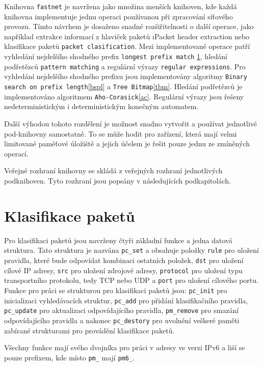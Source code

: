 Knihovna \texttt{fastnet} je navržena jako množina menších knihoven, kde každá knihovna implementuje
jednu operaci používanou při zpracování síťového provozu.
Tímto návrhem je dosaženo snadné rozšiřitelnosti o další operace, jako například extrakce informací z hlaviček paketů
\i{Packet header extraction} nebo klasifikace paketů \texttt{packet clasification}.
Mezi implementované operace patří vyhledání nejdelšího shodného prefix \texttt{longest prefix match} \ref{},
hledání podřetězců \texttt{pattern matching} a regulární výrazy \texttt{regular expressions}.
Pro vyhledání nejdelšího shodného prefixu jsou implementovány algoritmy
\texttt{Binary search on prefix length}\ref{bspl} a \texttt{Tree Bitmap}\ref{tbm}.
Hledání podřetězců je implementováno algoritmem \texttt{Aho-Corasick}\ref{ac}.
Regulární výrazy jsou řešeny nedeterministickým i deterministickým konečným automatem.

Další výhodou tohoto rozdělení je možnost snadno vytvořit a používat jednotlivé pod-knihovny samostatně.
To se může hodit pro zařízení, která mají velmi limitované paměťové úložiště a jejich účelem
je řešit pouze jednu ze zmíněných operací.

Veřejné rozhraní knihovny se skládá z veřejných rozhraní jednotlivých podknihoven.
Tyto rozhraní jsou popsány v následujících podkapitolách.

\section{Klasifikace paketů} %

Pro klasifikaci paketů jsou navrženy čtyři základní funkce a jedna datová struktura.
Tato struktura je nazvána \texttt{pc\_set} a obsahuje položky \texttt{rule} pro uložení pravidla,
které bude odpovídat kombinaci ostatních položek, \texttt{dst} pro uložení cílové IP adresy,
\texttt{src} pro uložení zdrojové adresy, \texttt{protocol} pro uložení typu transportního protokolu,
tedy TCP nebo UDP a \texttt{port} pro uložení cílového portu.
Funkce pro práci se strukturou pro klasifikaci paketů jsou: \texttt{pc\_init} pro inicializaci
vyhledávacích struktur, \texttt{pc\_add} pro přidání klasifikačního pravidla, \texttt{pc\_update}
pro aktualizaci odpovídajícího pravidla, \texttt{pm\_remove} pro smazání odpovídajícího pravidla
a nakonec \texttt{pc\_destory} pro uvolnění veškeré paměti zabírané strukturami pro provádění klasifikace
paketů.

Všechny funkce mají svého dvojníka pro práci v adresy ve verzi IPv6 a liší se pouze prefixem,
kde místo \texttt{pm\_} mají \texttt{pm6\_}.

